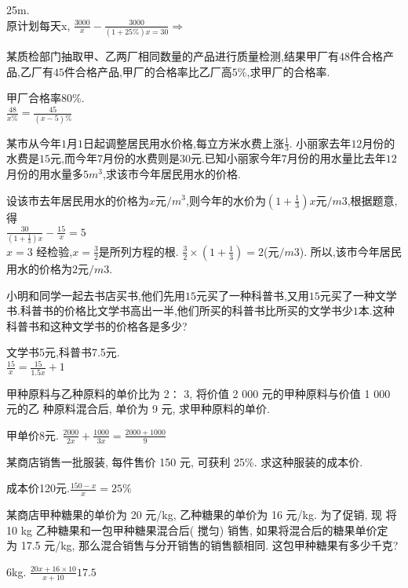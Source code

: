 \documentclass[cn,blue,12pt]{elegantbook}
\begin{document}
\begin{shiti}
\begin{solution}
        25m.\\
        原计划每天x, \(\frac{3000}{x}-\frac{3000}{(1+25\%)x=30} \Rightarrow \)
\end{solution}
\item 某质检部门抽取甲、乙两厂相同数量的产品进行质量检测,结果甲厂有\( 48 \)件合格产品,乙厂有\( 45 \)件合格产品,甲厂的合格率比乙厂高\( 5\%\),求甲厂的合格率.
\begin{solution}
        甲厂合格率80\%.\\
        \(\frac{48}{x\%}=\frac{45}{(x-5)\%}\)
\end{solution}
\item 某市从今年\( 1 \)月\( 1 \)日起调整居民用水价格,每立方米水费上涨\( \frac{1}{3}\). 小丽家去年\( 12 \)月份的水费是\( 15 \)元,而今年\( 7 \)月份的水费则是\( 30 \)元.已知小丽家今年\( 7 \)月份的用水量比去年\( 12 \)月份的用水量多\( 5 m^3 \),求该市今年居民用水的价格.
\begin{solution}
        设该市去年居民用水的价格为\( x \)元\(/m^3\),则今年的水价为\((1 + \frac{1}{3}) x\)元\(/m3\),根据题意,得\\
        \(\frac{30}{(1+\frac{1}{3})x}-\frac{15}{x}=5\)\\
\(x = 3\)
经检验,\( x = \frac{3}{2}\)是所列方程的根.
\(\frac{3}{2} \times  (1 + \frac{1}{3}) \)\( = 2\)(元\(/m3\)).
所以,该市今年居民用水的价格为\( 2 \)元\(/m3.\)
\end{solution}
\item 小明和同学一起去书店买书,他们先用\( 15 \)元买了一种科普书,又用\( 15 \)元买了一种文学书.科普书的价格比文学书高出一半,他们所买的科普书比所买的文学书少\( 1 \)本.这种科普书和这种文学书的价格各是多少?
\begin{solution}
        文学书5元,科普书7.5元.\\
        \(\frac{15}{x}=\frac{15}{1.5x}+1\)
\end{solution}
\item 甲种原料与乙种原料的单价比为 2∶ 3, 将价值 2 000 元的甲种原料与价值 1 000 元的乙 种原料混合后, 单价为 9 元, 求甲种原料的单价.
\begin{solution}
        甲单价8元. \(\frac{2000}{2x}+\frac{1000}{3x}=\frac{2000+1000}{9}\)
\end{solution}
\item 某商店销售一批服装, 每件售价 150 元, 可获利 25\%. 求这种服装的成本价.
\begin{solution}
        成本价120元.\(\frac{150-x}{x}=25\%\)
\end{solution}
\item 某商店甲种糖果的单价为 20 元/kg, 乙种糖果的单价为 16 元/kg. 为了促销, 现 将 10 kg 乙种糖果和一包甲种糖果混合后( 搅匀) 销售, 如果将混合后的糖果单价定 为 17.5 元/kg, 那么混合销售与分开销售的销售额相同. 这包甲种糖果有多少千克?
\begin{solution}
        6kg. \(\frac{20x+16\times 10}{x+10}17.5\)
\end{solution}
\end{shiti}
\end{document}
